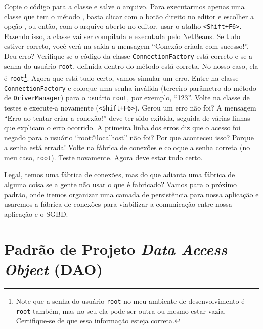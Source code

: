 
Copie o código para a classe e salve o arquivo. Para executarmos apenas uma classe que tem o método , basta clicar com o botão direito no editor e escolher a opção , ou então, com o arquivo aberto no editor, usar o atalho \texttt{<Shift+F6>}. Fazendo isso, a classe vai ser compilada e executada pelo NetBeans. Se tudo estiver correto, você verá na saída a mensagem ``Conexão criada com sucesso!''. Deu erro? Verifique se o código da classe \texttt{ConnectionFactory} está correto e se a senha do usuário \texttt{root}, definida dentro do método  está correta. No nosso caso, ela é \texttt{root}\footnote{Note que a senha do usuário \texttt{root} no meu ambiente de desenvolvimento é \texttt{root} também, mas no seu ela pode ser outra ou mesmo estar vazia. Certifique-se de que essa informação esteja correta.}. Agora que está tudo certo, vamos simular um erro. Entre na classe \texttt{ConnectionFactory} e coloque uma senha inválida (terceiro parâmetro do método  de \texttt{DriverManager}) para o usuário \texttt{root}, por exemplo, ``123''. Volte na classe de testes e execute-a novamente (\texttt{<Shift+F6>}). Gerou um erro não foi? A mensagem ``Erro ao tentar criar a conexão!'' deve ter sido exibida, seguida de várias linhas que explicam o erro ocorrido. A primeira linha dos erros diz que o acesso foi negado para o usuário ``root@localhost'' não foi? Por que aconteceu isso? Porque a senha está errada! Volte na fábrica de conexões e coloque a senha correta (no meu caso, \texttt{root}). Teste novamente. Agora deve estar tudo certo.

Legal, temos uma fábrica de conexões, mas do que adianta uma fábrica de alguma coisa se a gente não usar o que é fabricado? Vamos para o próximo padrão, onde iremos organizar uma camada de persistência para nossa aplicação e usaremos a fábrica de conexões para viabilizar a comunicação entre nossa aplicação e o SGBD.


\section{Padrão de Projeto \textit{Data Access Object} (DAO)}

